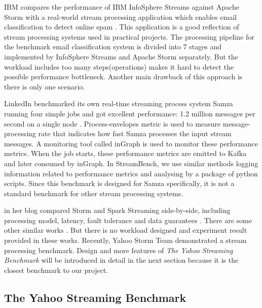 IBM compares the performance of IBM InfoSphere Streams against Apache Storm with a real-world stream processing application which enables email classification to detect online spam \cite{ibm2014streams}. This application is a good reflection of stream processing systems used in practical projects. The processing pipeline for the benchmark email classification system is divided into 7 stages and implemented by InfoSphere Streams and Apache Storm separately. But the workload includes too many steps(operations) makes it hard to detect the possible performance bottleneck. Another main drawback of this approach is there is only one scenario. 


LinkedIn benchmarked its own real-time streaming process system Samza running four simple jobs and got excellent performance: 1.2 million messages per second on a single node \cite{samza-benchmark}. Process-envelopes metric is used to measure message-processing rate that indicates how fast Samza processes the input stream messages. A monitoring tool called inGraph is used to monitor these performance metrics. When the job starts, these performance metrics are emitted to Kafka and later consumed by inGraph. In StreamBench, we use similar methods logging information related to performance metrics and analysing by a package of python scripts. Since this benchmark is designed for Samza specifically, it is not a standard benchmark for other stream processing systems.

\citeauthor{xinhstechblog} in her blog compared Storm and Spark Streaming side-by-side, including processing model, latency, fault tolerance and data guarantees \cite{xinhstechblog}. There are some other similar works \cite{manoj-sotrm-vs-spark, manoj-realtime}. But there is no workload designed and experiment result provided in these works. Recently, Yahoo Storm Team demonstrated a stream processing benchmark. Design and more features of \textit{The Yahoo Streaming Benchmark} will be introduced in detail in the next section because it is the closest benchmark to our project.

\subsection{The Yahoo Streaming Benchmark}
\label{subsection:ysb}


